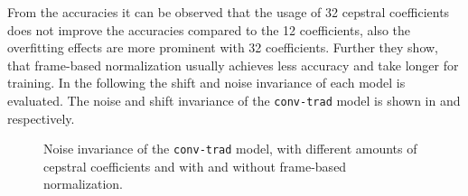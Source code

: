 \FloatBarrier
\noindent
From the accuracies it can be observed that the usage of 32 cepstral coefficients does not improve the accuracies compared to the 12 coefficients, also the overfitting effects are more prominent with 32 coefficients.
Further they show, that frame-based normalization usually achieves less accuracy and take longer for training.
In the following the shift and noise invariance of each model is evaluated.
The noise and shift invariance of the \texttt{conv-trad} model is shown in  and  respectively.
\begin{figure}[!ht]
  \centering
  \caption{Noise invariance of the \texttt{conv-trad} model, with different amounts of cepstral coefficients and with and without frame-based normalization.}
  \label{fig:exp_fs_cepstral_tb_noise_conv-trad}
\end{figure}
\FloatBarrier
\noindent
